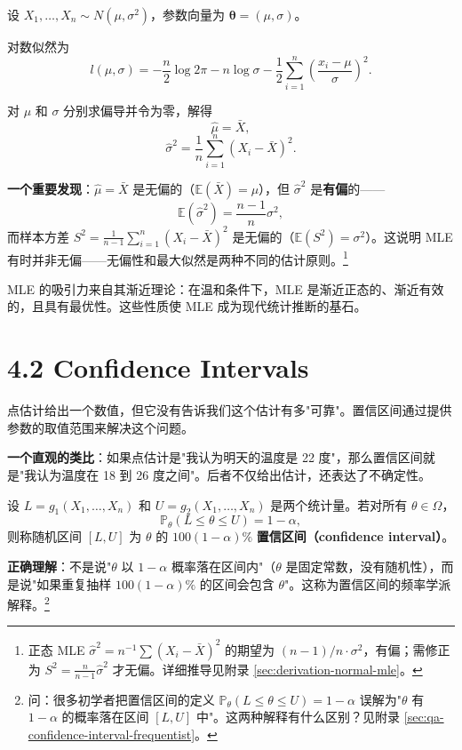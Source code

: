\begin{example}\label{ex:normal-mle-ch4}
设 $X_1, \ldots, X_n \sim N(\mu, \sigma^2)$，参数向量为 $\boldsymbol{\theta} = (\mu, \sigma)$。

对数似然为
\[
l(\mu, \sigma) = -\frac{n}{2}\log 2\pi - n\log\sigma - \frac{1}{2}\sum_{i=1}^n\left(\frac{x_i - \mu}{\sigma}\right)^2.
\label{eq:normal-log-likelihood}\]

对 $\mu$ 和 $\sigma$ 分别求偏导并令为零，解得
\[
\widehat{\mu} = \bar{X}, \label{eq:mle-normal-mu}\]
\[
\widehat{\sigma}^2 = \frac{1}{n}\sum_{i=1}^n (X_i - \bar{X})^2. \label{eq:mle-normal-sigma}\]

\textbf{一个重要发现}：$\widehat{\mu} = \bar{X}$ 是无偏的（$\mathbb{E}(\bar{X}) = \mu$），但 $\widehat{\sigma}^2$ 是\textbf{有偏}的——
\[
\mathbb{E}(\widehat{\sigma}^2) = \frac{n-1}{n}\sigma^2,
\]
而样本方差 $S^2 = \frac{1}{n-1}\sum_{i=1}^n (X_i - \bar{X})^2$ 是无偏的（$\mathbb{E}(S^2) = \sigma^2$）。这说明 MLE 有时并非无偏——无偏性和最大似然是两种不同的估计原则。\footnote{正态 MLE $\widehat{\sigma}^2 = n^{-1}\sum(X_i-\bar{X})^2$ 的期望为 $(n-1)/n \cdot \sigma^2$，有偏；需修正为 $S^2 = \frac{n}{n-1}\widehat{\sigma}^2$ 才无偏。详细推导见附录 \cref{sec:derivation-normal-mle}。}
\end{example}

MLE 的吸引力来自其渐近理论：在温和条件下，MLE 是渐近正态的、渐近有效的，且具有最优性。这些性质使 MLE 成为现代统计推断的基石。

\section{4.2 Confidence Intervals}\label{sec:4.2}

点估计给出一个数值，但它没有告诉我们这个估计有多"可靠"。置信区间通过提供参数的取值范围来解决这个问题。

\textbf{一个直观的类比}：如果点估计是"我认为明天的温度是 22 度"，那么置信区间就是"我认为温度在 18 到 26 度之间"。后者不仅给出估计，还表达了不确定性。

\begin{definition}[置信区间]\label{def:confidence-interval-ch4}
设 $L = g_1(X_1, \ldots, X_n)$ 和 $U = g_2(X_1, \ldots, X_n)$ 是两个统计量。若对所有 $\theta \in \Omega$，
\[
\mathbb{P}_\theta(L \leq \theta \leq U) = 1 - \alpha,
\]
则称随机区间 $[L, U]$ 为 $\theta$ 的 $100(1-\alpha)\%$ \textbf{置信区间（confidence interval）}。
\end{definition}

\textbf{正确理解}：不是说"$\theta$ 以 $1-\alpha$ 概率落在区间内"（$\theta$ 是固定常数，没有随机性），而是说"如果重复抽样 $100(1-\alpha)\%$ 的区间会包含 $\theta$"。这称为置信区间的频率学派解释。\footnote{问：很多初学者把置信区间的定义 $\mathbb{P}_\theta(L \leq \theta \leq U) = 1 - \alpha$ 误解为"$\theta$ 有 $1-\alpha$ 的概率落在区间 $[L, U]$ 中"。这两种解释有什么区别？见附录 \cref{sec:qa-confidence-interval-frequentist}。}

